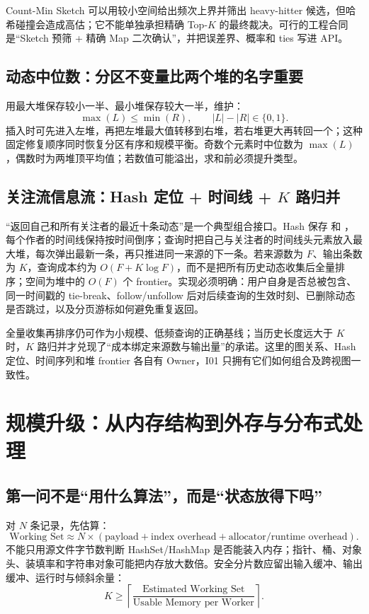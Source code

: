 \documentclass[UTF8,fontset=none,11pt,a4paper]{ctexart}
\begin{document}
Count-Min Sketch 可以用较小空间给出频次上界并筛出 heavy-hitter 候选，但哈希碰撞会造成高估；它不能单独承担精确 Top-$K$ 的最终裁决。可行的工程合同是“Sketch 预筛 + 精确 Map 二次确认”，并把误差界、概率和 ties 写进 API。

\subsection{动态中位数：分区不变量比两个堆的名字重要}
用最大堆保存较小一半、最小堆保存较大一半，维护：
\[
\boxed{
\max(L)\le \min(R),\qquad |L|-|R|\in\{0,1\}.}
\]
插入时可先进入左堆，再把左堆最大值转移到右堆，若右堆更大再转回一个；这种固定修复顺序同时恢复分区有序和规模平衡。奇数个元素时中位数为 $\max(L)$，偶数时为两堆顶平均值；若数值可能溢出，求和前必须提升类型。

\subsection{关注流信息流：Hash 定位 + 时间线 + $K$ 路归并}
“返回自己和所有关注者的最近十条动态”是一个典型组合接口。Hash 保存  和 ，每个作者的时间线保持按时间倒序；查询时把自己与关注者的时间线头元素放入最大堆，每次弹出最新一条，再只推进同一来源的下一条。若来源数为 $F$、输出条数为 $K$，查询成本约为 $O(F+K\log F)$，而不是把所有历史动态收集后全量排序；空间为堆中的 $O(F)$ 个 frontier。实现必须明确：用户自身是否总被包含、同一时间戳的 tie-break、follow/unfollow 后对后续查询的生效时刻、已删除动态是否跳过，以及分页游标如何避免重复返回。

全量收集再排序仍可作为小规模、低频查询的正确基线；当历史长度远大于 $K$ 时，$K$ 路归并才兑现了“成本绑定来源数与输出量”的承诺。这里的图关系、Hash 定位、时间序列和堆 frontier 各自有 Owner，I01 只拥有它们如何组合及跨视图一致性。

\section{规模升级：从内存结构到外存与分布式处理}

\subsection{第一问不是“用什么算法”，而是“状态放得下吗”}
对 $N$ 条记录，先估算：
\[
\text{Working Set}
\approx N\times(\text{payload}+\text{index overhead}+\text{allocator/runtime overhead}).
\]
不能只用源文件字节数判断 HashSet/HashMap 是否能装入内存；指针、桶、对象头、装填率和字符串对象可能把内存放大数倍。安全分片数应留出输入缓冲、输出缓冲、运行时与倾斜余量：
\[
K\ge
\left\lceil
\frac{\text{Estimated Working Set}}
     {\text{Usable Memory per Worker}}
\right\rceil.
\]
\end{document}
